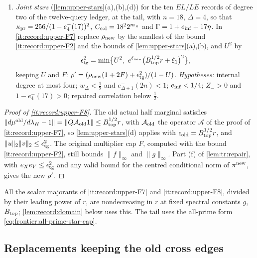 \begin{enumerate}[label=\textup{(F\arabic*)},start=8]
\item\label{it:record:upper-F8} \emph{Joint stars} (\cref{lem:upper-stars}(a),(b),(d))
 for the ten $EL/LE$ records of degree two of the twelve-query ledger, at the
 tail, with $n=18$, $\Delta=4$, so that
 $\kappa_{\rm pr}=256/(1-e^-_4(17))^2$, $C_{\rm col}=18^22^{m_\times}$ and
 $\Gamma=1+e_{\rm inf}+17\eta$. In \ref{it:record:upper-F7} replace
 $\rho_{\rm new}$ by the smallest of the bound \ref{it:record:upper-F2} and the
 bounds of \cref{lem:upper-stars}(a),(b), and $U^2$ by
 \[
  \epsilon_{\rm tg}^2=\min\bigl\{U^2,\ e^{\ell_{\rm new}}
  \bigl(B_{\rm top}^{1/2}r+\xi_1\bigr)^2\bigr\},
 \]
 keeping $U$ and $F$:
 $\rho'=(\rho_{\rm new}(1+2F)+\epsilon_{\rm tg}^2)/(1-U)$. \emph{Hypotheses:}
 internal degree at most four; $w_\Delta<\frac12$ and $e^-_{\Delta+1}(2n)<1$;
 $e_{\rm inf}<\frac14$; $Z_->0$ and $1-e^-_4(17)>0$; repaired correlation
 below $\frac12$.
\end{enumerate}

\begin{proof}[Proof of \ref{it:record:upper-F8}]
The old actual half marginal satisfies
$\|d\mu^{\rm old}/d\lambda_H-1\|=\|Q\mathcal A_{\rm old}1\|\le
B_{\rm top}^{1/2}r$, with $\mathcal A_{\rm old}$ the operator $\mathcal A$ of
the proof of \ref{it:record:upper-F7}, so
\cref{lem:upper-stars}(d) applies with $\epsilon_{\rm old}=B_{\rm top}^{1/2}r$,
and $\|u\|_2\|v\|_2\le\epsilon_{\rm tg}^2$. The original multiplier cap $F$,
computed with the bound \ref{it:record:upper-F2}, still bounds
$\|f\|_\infty$ and $\|g\|_\infty$. Part (f) of \cref{lem:tr:repair}, with
$e_Xe_Y\le\epsilon_{\rm tg}^2$ and any valid bound for the centred conditional
norm of $\pi^{\rm new}$, gives the new $\rho'$.
\end{proof}

All the scalar majorants of \ref{it:record:upper-F7} and \ref{it:record:upper-F8},
divided by their leading power of $r$, are nondecreasing in $r$ at fixed
spectral constants $g$, $B_{\rm top}$; \cref{lem:record:domain} below uses this.
The tail uses the all-prime form \eqref{eq:frontier:all-prime-star-cap}.

\subsection{Replacements keeping the old cross edges}\label{subsec:upper-actual-frames}

